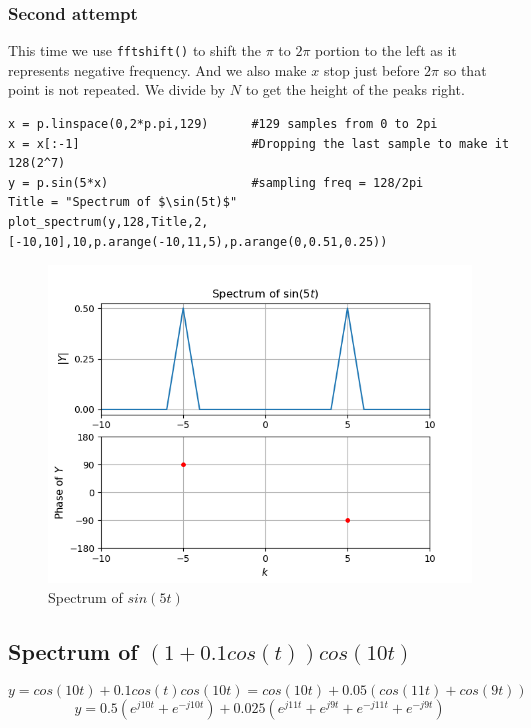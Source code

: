 \documentclass[11pt, a4paper]{article}
\begin{document}
        \subsubsection{Second attempt}
        This time we use \texttt{fftshift()} to shift the $\pi$ to $2\pi$ portion to the left as it represents negative frequency. And we also make $x$ stop just before $2\pi$ so that point is not repeated. We divide by $N$ to get the height of the peaks right.
        \begin{verbatim}
x = p.linspace(0,2*p.pi,129)      #129 samples from 0 to 2pi
x = x[:-1]                        #Dropping the last sample to make it 128(2^7)
y = p.sin(5*x)                    #sampling freq = 128/2pi
Title = "Spectrum of $\sin(5t)$"
plot_spectrum(y,128,Title,2,[-10,10],10,p.arange(-10,11,5),p.arange(0,0.51,0.25))
        \end{verbatim}
        \begin{figure}[!h]
            \centering
            \includegraphics[scale = 0.66]{Figure 2.png}
            \caption{Spectrum of $sin(5t)$}
            \label{fig:Figure 2}
        \end{figure}
    \subsection{Spectrum of $(1+0.1cos(t))cos(10t)$}
    \begin{equation*}
        y = cos(10t) + 0.1cos(t)cos(10t) = cos(10t) + 0.05(cos(11t) +cos(9t))
    \end{equation*}
    \begin{equation*}
        y = 0.5(e^{j10t} + e^{-j10t}) + 0.025(e^{j11t} + e^{j9t} + e^{-j11t} + e^{-j9t})
    \end{equation*}
\end{document}
